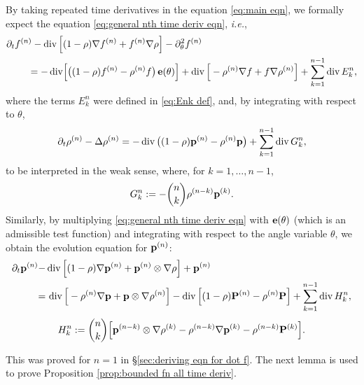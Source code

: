 \documentclass[11pt,a4paper,reqno]{amsart}
\theoremstyle{remark}
\theoremstyle{definition}
\numberwithin{equation}{section}
\DeclareMathOperator{\dv}{div}
\renewcommand{\P}{{\bf P}}
\newcommand{\p}{{\bf p}}
\newcommand{\e}{{\bf e}}
\newcommand{\ff}[1]{f^{(#1)}}
\newcommand{\rr}[1]{\rho^{(#1)}}
\def\de{\partial}
\begin{document}
By taking repeated time derivatives in the equation \eqref{eq:main eqn}, we formally expect the equation \eqref{eq:general nth time deriv eqn}, \textit{i.e.}, 
    \begin{equation*}
    \begin{aligned}
    \de_t \ff{n} - \dv\Big[ & (1-\rho)\nabla\ff{n} + \ff{n}\nabla \rho \Big]  - \partial^2_\theta \ff{n} \\ 
    = -\dv & \Big[
    \big( (1- \rho) \ff{n} -\rr{n} f
    \big) \,\e(\theta)
    \Big] + \dv\Big[  -\rr{n}\nabla f + f\nabla \rr{n}  \Big]  + \sum_{k=1}^{n-1} \dv E^n_k,  
\end{aligned}
\end{equation*}
where the terms $E_k^n$ were defined in \eqref{eq:Enk def}, and, by integrating with respect to $\theta$, 
\begin{equation}\label{eq:general nth rho n}
        \begin{aligned}
    \de_t \rr{n} -  \Delta \rr{n} = - \dv 
    \big( (1- \rho) \p^{(n)} -\rr{n} \p\big) + \sum_{k=1}^{n-1} \dv G^n_k,  
\end{aligned}
\end{equation}
to be interpreted in the weak sense, where, for $k=1,\dots,n-1$, 
\begin{equation}\label{eq:def Gnk}
    G^n_k := -\binom{n}{k} \rr{n-k} \p^{(k)}. 
\end{equation}
Similarly, by multiplying \eqref{eq:general nth time deriv eqn} with $\e(\theta)$ (which is an admissible test function) and integrating with respect to the angle variable $\theta$, we obtain the evolution equation for $\p^{(n)}$: 
    \begin{equation}\label{eq:eqn for p nth time deriv}
    \begin{aligned}
    \de_t \p^{(n)} - & \dv\Big[(1-\rho)\nabla\p^{(n)}  + \p^{(n)}\otimes \nabla \rho  \Big]  + \p^{(n)}
\\ 
=& \, \dv\Big[  -\rr{n}\nabla \p  + \p \otimes \nabla \rr{n}  \Big] - \dv \Big[
 (1- \rho) \P^{(n)} -\rr{n} \P
    \Big] + \sum_{k=1}^{n-1} \dv H^n_k,  
\end{aligned}
\end{equation}
\begin{equation}\label{eq:Hnk def}
    H^n_k := \binom{n}{k} \Big[ \p^{(n-k)} \otimes \nabla \rho^{(k)} - \rho^{(n-k)} \nabla \p^{(k)} - \rho^{(n-k)} \P^{(k)}   \Big]. 
\end{equation}




This was proved for $n=1$ in \S \ref{sec:deriving eqn for dot f}. The next lemma is used to prove Proposition \ref{prop:bounded fn all time deriv}. 
\end{document}
